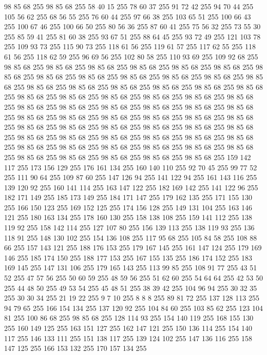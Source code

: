 98 85 68 255 98 85 68 255 58 40 15 255 78 60 37 255 91 72 42 255 94 70 44 255 105 56 62 255 68 56 55 255 76 60 44 255 97 66 38 255 103 65 51 255 100 66 43 255 100 67 46 255 100 66 50 255 80 56 36 255 87 60 41 255 75 56 32 255 73 55 30 255 85 59 41 255 81 60 38 255 93 67 51 255 88 64 45 255 93 72 49 255 121 103 78 255 109 93 73 255 115 90 73 255 118 61 56 255 119 61 57 255 117 62 55 255 118 61 56 255 118 62 59 255 96 69 56 255 102 80 58 255 110 93 69 255 109 92 68 255 98 85 68 255 98 85 68 255 98 85 68 255 98 85 68 255 98 85 68 255 98 85 68 255 98 85 68 255 98 85 68 255 98 85 68 255 98 85 68 255 98 85 68 255 98 85 68 255 98 85 68 255 98 85 68 255 98 85 68 255 98 85 68 255 98 85 68 255 98 85 68 255 98 85 68 255 98 85 68 255 98 85 68 255 98 85 68 255 98 85 68 255 98 85 68 255 98 85 68 255 98 85 68 255 98 85 68 255 98 85 68 255 98 85 68 255
98 85 68 255 98 85 68 255 98 85 68 255 98 85 68 255 98 85 68 255 98 85 68 255 98 85 68 255 98 85 68 255 98 85 68 255 98 85 68 255 98 85 68 255 98 85 68 255 98 85 68 255 98 85 68 255 98 85 68 255 98 85 68 255 98 85 68 255 98 85 68 255 98 85 68 255 98 85 68 255 98 85 68 255 98 85 68 255 98 85 68 255 98 85 68 255 98 85 68 255 98 85 68 255 98 85 68 255 98 85 68 255 98 85 68 255 98 85 68 255 98 85 68 255 159 142 117 255 173 156 129 255 176 161 134 255 160 140 110 255 92 70 45 255 99 77 52 255 111 90 64 255 109 87 60 255 147 126 94 255 141 122 94 255 161 143 116 255 139 120 92 255 160 141 114 255 163 147 122 255 182 169 142 255 141 122 96 255 182 171 149 255 185 173 149 255 184 171 147 255 179 162 135 255 171 155 130 255 166 150 123 255 169 152 125 255 174 156 128 255 149 131 104 255 163 146 121 255 180 163 134 255 178 160 130 255 158 138 108 255 159 141 112 255 138 119 92 255 158 142 114 255 127 107 80 255
156 139 113 255 138 119 93 255 136 118 91 255 148 130 102 255 154 136 108 255 117 95 68 255 105 84 58 255 108 88 66 255 157 143 121 255 188 176 153 255 179 167 145 255 161 147 124 255 179 169 146 255 185 174 150 255 188 177 153 255 167 155 135 255 186 174 152 255 183 169 145 255 147 131 106 255 179 165 143 255 113 99 85 255 108 91 77 255 43 51 52 255 47 57 56 255 50 60 59 255 48 59 56 255 51 62 60 255 54 64 64 255 42 53 50 255 44 48 50 255 49 53 54 255 45 48 51 255 38 39 42 255 104 96 94 255 30 32 35 255 30 30 34 255 21 19 22 255 9 7 10 255 8 8 8 255 89 81 72 255 137 128 113 255 94 79 65 255 166 154 134 255 137 120 92 255 104 84 60 255 103 85 62 255 123 104 81 255 100 86 68 255 98 85 68 255 128 114 93 255 154 140 119 255 168 155 130 255 160 149 125 255 163 151 127 255 162 147 121 255 150 136 114 255 154 140 117 255 146 133 111 255 151 138 117 255 139 124 102 255 147 136 116 255 158 147 125 255 166 153 132 255 170 157 134 255
